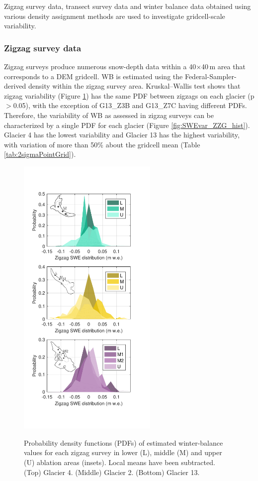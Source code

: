 \documentclass{sfuthesis}
\begin{document}
{Zigzag survey data, transect survey data and winter balance data obtained using various density assignment methods are used to investigate gridcell-scale variability. 

\subsubsection{Zigzag survey data}
Zigzag surveys produce numerous snow-depth data within a 40$\times$40\,m area that corresponds to a DEM gridcell. WB is estimated using the Federal-Sampler-derived density within the zigzag survey area. Kruskal--Wallis test shows that zigzag variability (Figure \ref{fig:SWEvar_ZZ_hist}) has the same PDF between zigzags on each glacier (p$>$0.05), with the exception of G13\_Z3B and G13\_Z7C having different PDFs. Therefore, the variability of WB as assessed in zigzag surveys can be characterized by a single PDF for each glacier (Figure \ref{fig:SWEvar_ZZG_hist}). Glacier 4 has the lowest variability and Glacier 13 has the highest variability, with variation of more than 50\% about the gridcell mean (Table  \ref{tab:2sigmaPointGrid}). 

\begin{figure}[H]
	\centering
	\includegraphics[width =0.6\textwidth]{ZigzagHistogram.pdf}\\
	\caption[Probability density functions (PDFs) of estimated winter-balance values for each zigzag survey in lower (L), middle (M) and upper (U) ablation areas]{Probability density functions (PDFs) of estimated winter-balance values for each zigzag survey in lower (L), middle (M) and upper (U) ablation areas (insets). Local means have been subtracted. (Top) Glacier 4. (Middle) Glacier 2. (Bottom) Glacier 13.}
	\label{fig:SWEvar_ZZ_hist}
\end{figure}

}
\end{document}
